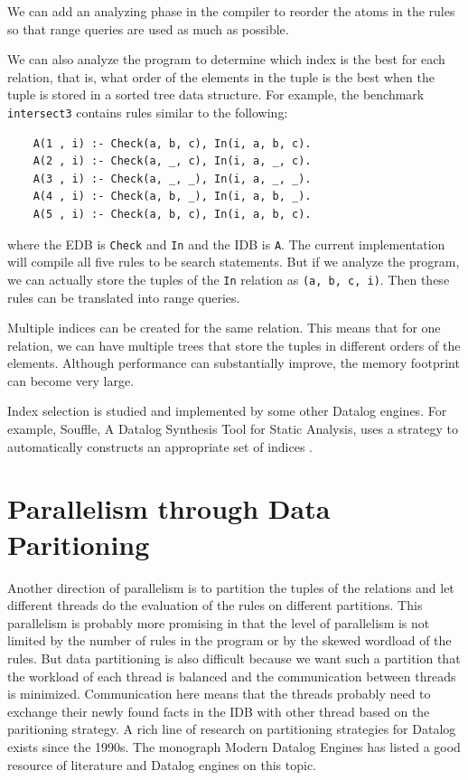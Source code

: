 \documentclass[11pt]{report}
\theoremstyle{definition}
\begin{document}
We can add an analyzing phase in the compiler to reorder the atoms in the rules so that range queries are used as much as possible.

We can also analyze the program to determine which index is the best for each relation, that is, what order of the elements in the tuple is the best when the tuple is stored in a sorted tree data structure. For example, the benchmark \texttt{intersect3} contains rules similar to the following:

\begin{verbatim}
    A(1 , i) :- Check(a, b, c), In(i, a, b, c).
    A(2 , i) :- Check(a, _, c), In(i, a, _, c).
    A(3 , i) :- Check(a, _, _), In(i, a, _, _).
    A(4 , i) :- Check(a, b, _), In(i, a, b, _).
    A(5 , i) :- Check(a, b, c), In(i, a, b, c).
\end{verbatim}

where the EDB is \texttt{Check} and \texttt{In} and the IDB is \texttt{A}. The current implementation will compile all five rules to be search statements. But if we analyze the program, we can actually store the tuples of the \texttt{In} relation as \texttt{(a, b, c, i)}. Then these rules can be translated into range queries.

Multiple indices can be created for the same relation. This means that for one relation, we can have multiple trees that store the tuples in different orders of the elements. Although performance can substantially improve, the memory footprint can become very large.

Index selection is studied and implemented by some other Datalog engines. For example, Souffle, A Datalog Synthesis Tool for Static Analysis, uses a strategy to automatically constructs an appropriate set of indices \cite{10.14778/3282495.3282500}.

\section{Parallelism through Data Paritioning}

Another direction of parallelism is to partition the tuples of the relations and let different threads do the evaluation of the rules on different partitions. This parallelism is probably more promising in that the level of parallelism is not limited by the number of rules in the program or by the skewed wordload of the rules. But data partitioning is also difficult because we want such a partition that the workload of each thread is balanced and the communication between threads is minimized. Communication here means that the threads probably need to exchange their newly found facts in the IDB with other thread based on the paritioning strategy. A rich line of research on partitioning strategies for Datalog exists since the 1990s. The monograph Modern Datalog Engines \cite{DBS-073} has listed a good resource of literature and Datalog engines on this topic.
\end{document}
